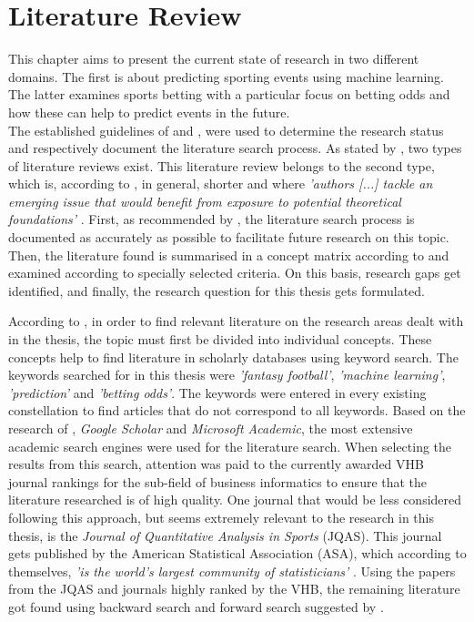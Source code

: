 \chapter{Literature Review}
This chapter aims to present the current state of research in two different domains. The first is about predicting sporting events using machine learning. The latter examines sports betting with a particular focus on betting odds and how these can help to predict events in the future. \\
The established guidelines of \cite{vom_brocke_standing_2015} and \cite{webster_guest_2002}, were used to determine the research status and respectively document the literature search process. As stated by \citeauthor{webster_guest_2002}, two types of literature reviews exist. This literature review belongs to the second type, which is, according to \citeauthor{webster_guest_2002}, in general, shorter and where \emph{'authors [...] tackle an emerging issue that would benefit from exposure to potential theoretical foundations'} \parencite[, p. 14]{webster_guest_2002}. First, as recommended by \citeauthor{vom_brocke_standing_2015}, the literature search process is documented as accurately as possible to facilitate future research on this topic. Then, the literature found is summarised in a concept matrix according to \citeauthor{webster_guest_2002} and examined according to specially selected criteria. On this basis, research gaps get identified, and finally, the research question for this thesis gets formulated.

According to \citeauthor{vom_brocke_standing_2015}, in order to find relevant literature on the research areas dealt with in the thesis, the topic must first be divided into individual concepts. These concepts help to find literature in scholarly databases using keyword search. The keywords searched for in this thesis were \emph{'fantasy football'}, \emph{'machine learning'}, \emph{'prediction'} and \emph{'betting odds'}. The keywords were entered in every existing constellation to find articles that do not correspond to all keywords. Based on the research of \cite{gusenbauer_google_2019}, \emph{Google Scholar} and \emph{Microsoft Academic}, the most extensive academic search engines were used for the literature search. When selecting the results from this search, attention was paid to the currently awarded VHB journal rankings \parencite[see][]{vhb_e_v_vhb-jourqual3_2015} for the sub-field of business informatics to ensure that the literature researched is of high quality. One journal that would be less considered following this approach, but seems extremely relevant to the research in this thesis, is the \emph{Journal of Quantitative Analysis in Sports} (JQAS). This journal gets published by the American Statistical Association (ASA), which according to themselves, \emph{'is the world's largest community of statisticians'} \parencite[see][]{noauthor_about_nodate}. Using the papers from the JQAS and journals highly ranked by the VHB, the remaining literature got found using backward search and forward search suggested by \citeauthor{webster_guest_2002}.







